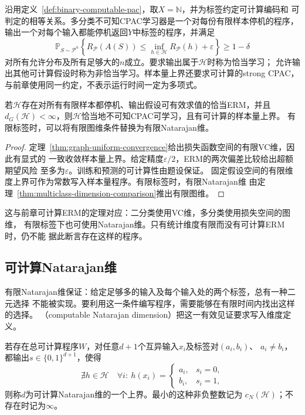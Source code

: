 沿用定义~\ref{def:binary-computable-pac}，取$X=\mathbb N$，并为标签约定可计算编码和
可判定的相等关系。多分类不可知CPAC学习器是一个对每份有限样本停机的程序，
输出一个对每个输入都能停机返回$Y$中标签的程序，并满足
\[
 \mathbb P_{S\sim\mathcal P^n}\!\left\{
 R_{\mathcal P}(A(S))\leq\inf_{h\in\mathcal H}R_{\mathcal P}(h)+\varepsilon
 \right\}\geq1-\delta
\]
对所有允许分布及所有足够大的$n$成立。要求输出属于$\mathcal H$时称为恰当学习；
允许输出其他可计算假设时称为非恰当学习。样本量上界还要求可计算的strong CPAC，
与前章使用同一约定，不表示运行时间一定为多项式。

\begin{theorem}[多分类可计算ERM的充分条件]
\label{thm:multiclass-computable-erm}
若$\mathcal H$存在对所有有限样本都停机、输出假设可有效求值的恰当ERM，并且
$d_G(\mathcal H)<\infty$，则$\mathcal H$恰当地不可知CPAC可学习，且有可计算的样本量上界。
有限标签时，可以将有限图维条件替换为有限Natarajan维。
\end{theorem}

\begin{proof}
定理~\ref{thm:graph-uniform-convergence}给出损失函数空间的有限VC维，因此有显式的
一致收敛样本量上界。给定精度$\varepsilon/2$，ERM的两次偏差比较给出超额期望风险
至多为$\varepsilon$。训练和预测的可计算性由题设保证。
固定假设空间的有限维度上界可作为常数写入样本量程序。有限标签时，有限Natarajan维
由定理~\ref{thm:multiclass-dimension-comparison}推出有限图维。
\end{proof}

这与前章可计算ERM的定理对应：二分类使用VC维，多分类使用损失空间的图维，
有限标签下也可使用Natarajan维。只有统计维度有限而没有可计算ERM时，仍不能
据此断言存在这样的程序。

\subsection{可计算Natarajan维}

有限Natarajan维保证：给定足够多的输入及每个输入处的两个标签，总有一种二元选择
不能被实现。要利用这一条件编写程序，需要能够在有限时间内找出这样的选择。
（computable Natarajan dimension）把这一有效见证要求写入维度定义。

\begin{definition}[可计算Natarajan维]
\label{def:computable-natarajan-dimension}
若存在总可计算程序$W$，对任意$d+1$个互异输入$x_i$及标签对$(a_i,b_i)$、
$a_i\neq b_i$，都输出$s\in\{0,1\}^{d+1}$，使得
\[
 \nexists h\in\mathcal H\quad
 \forall i:\ h(x_i)=\begin{cases}a_i,&s_i=0,\\b_i,&s_i=1,\end{cases}
\]
则称$d$为可计算Natarajan维的一个上界。最小的这种非负整数记为
$c_N(\mathcal H)$；不存在时记为$\infty$。
\end{definition}

